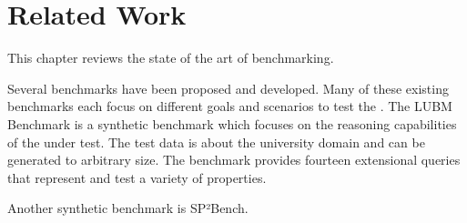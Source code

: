 \chapter{Related Work}
\label{ch:related_work}

This chapter reviews the state of the art of \ts{} benchmarking.

Several benchmarks have been proposed and developed.
Many of these existing benchmarks each focus on different goals and scenarios to test the \tsp{}.
The LUBM Benchmark\cite{guoLUBMBenchmarkOWL2005} is a synthetic benchmark which focuses on the reasoning capabilities of the \tsp{} under test.
The test data is about the university domain and can be generated to arbitrary size.
The benchmark provides fourteen extensional queries that represent and test a variety of properties.

Another synthetic benchmark is SP²Bench\cite{schmidtSP2BenchSPARQLPerformance2008}.


